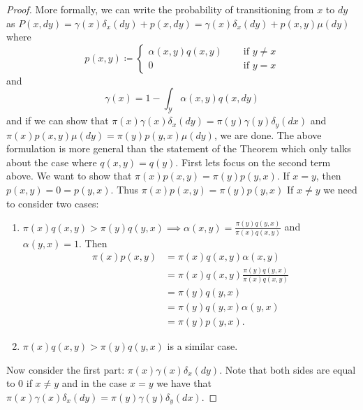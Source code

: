 \documentclass[12pt, leqno]{article}
\begin{document}
\begin{proof}
More formally, we can write the probability of transitioning from $x$ to
$dy$ as $P(x,dy) = \gamma(x) \delta_x(dy) + p(x,dy)
 = \gamma(x) \delta_x(dy) + p(x,y) \mu (dy)$
where
\[
p(x,y) \coloneqq \begin{cases} \alpha(x,y) q(x,y) &\quad \text{ if } y \not= x
  \\
0 &\quad \text{ if } y = x
\end{cases}
\]
and 
\[
\gamma(x) = 1 - \int_{\mathcal{Y}} \alpha(x,y) q(x,dy)
\]
 and if we can show that 
$\pi(x) \gamma(x) \delta_x(dy)= \pi(y) \gamma(y) \delta_y(dx)$ and $\pi(x)p(x,y) \mu(dy) = \pi(y)p(y,x) \mu(dy)$, we
are done. The above formulation is more general than the statement of
the Theorem which only talks about the case where $q(x,y) = q(y)$.
First lets focus on the second term above. 
We want to show that $\pi(x)p(x,y) = \pi(y)p(y,x)$. If $x = y$, then
$p(x,y) = 0 = p(y,x)$. Thus $\pi(x)p(x,y)  = \pi(y)p(y,x) $ If $x \not= y$ we need to consider two cases:
\begin{enumerate}
\item $\pi(x)q(x,y) > \pi(y)q(y,x) \implies \alpha(x,y)  =
  \frac{\pi(y)q(y,x)}{\pi(x)q(x,y)}$ and $\alpha(y,x) = 1$. Then 
\begin{align*}
\pi(x)p(x,y)  &= \pi(x)q(x,y)\alpha(x,y) \\
&= \pi(x)q(x,y)\frac{\pi(y)q(y,x)}{\pi(x)q(x,y)} \\
&= \pi(y)q(y,x) \\
&= \pi(y)q(y,x)\alpha(y,x)\\
&= \pi(y)p(y,x).
\end{align*}
\item $\pi(x)q(x,y) > \pi(y)q(y,x)$ is a similar case.
\end{enumerate}
Now consider the first
part: $\pi(x) \gamma(x) \delta_x(dy)$. Note that both sides are equal to 0 if $x\not=y$ and in
the case $x = y$ we have that $\pi(x) \gamma(x) \delta_x(dy)= \pi(y) \gamma(y)
\delta_y(dx)$.
\end{proof} 
\end{document}
